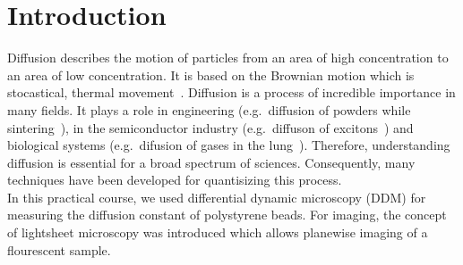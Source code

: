 

\chapter{Introduction}\label{chap:einleitung}

Diffusion describes the motion of particles from an area of high concentration to an area of low concentration. It is based on the Brownian motion which is stocastical, thermal movement~\cite{Demtroeder.2021}. Diffusion is a process of incredible importance in many fields. It plays a role in engineering (e.g.~diffusion of powders while sintering~\cite{Johnson.1963}), in the semiconductor industry (e.g.~diffuson of excitons~\cite{Mikhnenko.2015}) and biological systems (e.g.~difusion of gases in the lung~\cite{Liptay.2009}). Therefore, understanding diffusion is essential for a broad spectrum of sciences. Consequently, many techniques have been developed for quantisizing this process. \\
In this practical course, we used differential dynamic microscopy (DDM) for measuring the diffusion constant of polystyrene beads. For imaging, the concept of lightsheet microscopy was introduced which allows planewise imaging of a flourescent sample. 
